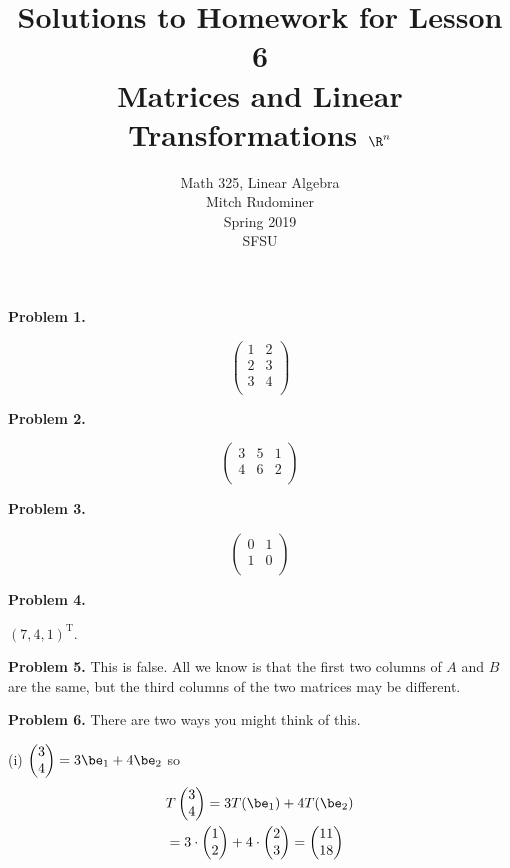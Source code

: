 \documentclass[oneside,12pt]{amsart}
\begin{document}
\title{Solutions to Homework for Lesson 6 \\ Matrices and Linear Transformations $\R^n$}
\author{Math 325, Linear Algebra \\ Mitch Rudominer \\ Spring 2019 \\ SFSU }
\date{}

\maketitle

\textbf{Problem 1.}

$$
\begin{pmatrix}
1 & 2 \\
2 & 3 \\
3 & 4 \\
\end{pmatrix}
$$

\medskip

\textbf{Problem 2.}


$$
\begin{pmatrix}
3 & 5 & 1 \\
4 & 6 & 2 \\
\end{pmatrix}
$$

\medskip

\textbf{Problem 3.}

$$
\begin{pmatrix}
0 & 1 \\
1 & 0 \\
\end{pmatrix}
$$

\medskip

\textbf{Problem 4.}

$(7, 4, 1)^{\text{T}}$.

\medskip

\textbf{Problem 5.} This is false. All we know is that the first
two columns of $A$ and $B$ are the same, but the third columns of
the two matrices may be different.

\medskip


\textbf{Problem 6.} There are two ways you might think of this.

\smallskip

(i) $\begin{pmatrix} 3 \\ 4\end{pmatrix} = 3 \be_1 + 4 \be_2$
so
\begin{align*}
&T\begin{pmatrix} 3 \\ 4\end{pmatrix} = 3 T(\be_1) + 4 T(\be_2) \\
&= 3\cdot \begin{pmatrix} 1 \\ 2\end{pmatrix} + 4 \cdot \begin{pmatrix} 2 \\ 3\end{pmatrix}
=\begin{pmatrix} 11 \\ 18\end{pmatrix}
\end{align*}
\end{document}
